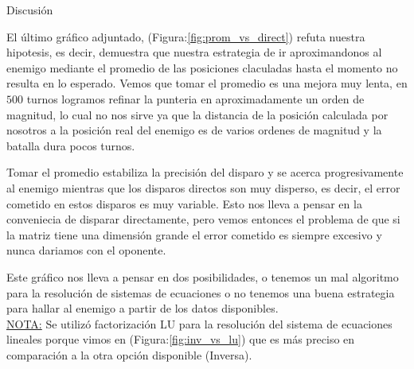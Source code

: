 \begin{section}{Discusión}
	
	El último gráfico adjuntado, (Figura:\ref{fig:prom_vs_direct}) refuta nuestra hipotesis, es decir, demuestra que nuestra estrategia de ir aproximandonos al enemigo mediante el promedio de las posiciones claculadas hasta el momento no resulta en lo esperado. Vemos que tomar el promedio es una mejora muy lenta, en $500$ turnos logramos refinar la punteria en aproximadamente un orden de magnitud, lo cual no nos sirve ya que la distancia de la posición calculada por nosotros a la posición real del enemigo es de varios ordenes de magnitud y la batalla dura pocos turnos.
	
	Tomar el promedio estabiliza la precisión del disparo y se acerca progresivamente al enemigo mientras que los disparos directos son muy disperso, es decir, el error cometido en estos disparos es muy variable. Esto nos lleva a pensar en la conveniecia de disparar directamente, pero vemos entonces el problema de que si la matriz tiene una dimensión grande el error cometido es siempre excesivo y nunca dariamos con el oponente.
	
	Este gráfico nos lleva a pensar en dos posibilidades, o tenemos un mal algoritmo para la resolución de sistemas de ecuaciones o no tenemos una buena estrategia para hallar al enemigo a partir de los datos disponibles.\\

	\underline{NOTA:} Se utilizó factorización LU para la resolución del sistema de ecuaciones lineales porque vimos en (Figura:\ref{fig:inv_vs_lu}) que es más preciso en comparación a la otra opción disponible (Inversa). 

\end{section}
